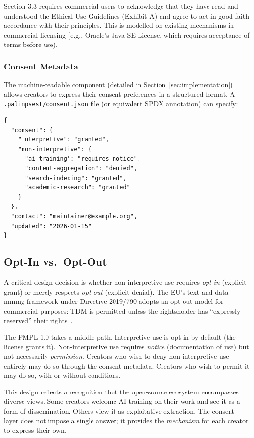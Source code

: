 \documentclass[11pt,twocolumn]{article}
\begin{document}
Section 3.3 requires commercial users to acknowledge that they have read
and understood the Ethical Use Guidelines (Exhibit A) and agree to act in
good faith accordance with their principles. This is modelled on existing
mechanisms in commercial licensing (e.g., Oracle's Java SE License, which
requires acceptance of terms before use).

\subsubsection{Consent Metadata}

The machine-readable component (detailed in Section~\ref{sec:implementation})
allows creators to express their consent preferences in a structured
format. A \texttt{.palimpsest/consent.json} file (or equivalent SPDX
annotation) can specify:

\begin{lstlisting}
{
  "consent": {
    "interpretive": "granted",
    "non-interpretive": {
      "ai-training": "requires-notice",
      "content-aggregation": "denied",
      "search-indexing": "granted",
      "academic-research": "granted"
    }
  },
  "contact": "maintainer@example.org",
  "updated": "2026-01-15"
}
\end{lstlisting}

\subsection{Opt-In vs.\ Opt-Out}

A critical design decision is whether non-interpretive use requires
\emph{opt-in} (explicit grant) or merely respects \emph{opt-out}
(explicit denial). The EU's text and data mining framework under
Directive 2019/790 adopts an opt-out model for commercial purposes: TDM
is permitted unless the rightsholder has ``expressly reserved'' their
rights~\cite{eu-dsm-directive}.

The PMPL-1.0 takes a middle path. Interpretive use is opt-in by default
(the license grants it). Non-interpretive use requires \emph{notice}
(documentation of use) but not necessarily \emph{permission}. Creators
who wish to deny non-interpretive use entirely may do so through the
consent metadata. Creators who wish to permit it may do so, with or
without conditions.

This design reflects a recognition that the open-source ecosystem
encompasses diverse views. Some creators welcome AI training on their
work and see it as a form of dissemination. Others view it as
exploitative extraction. The consent layer does not impose a single
answer; it provides the \emph{mechanism} for each creator to express
their own.
\end{document}
